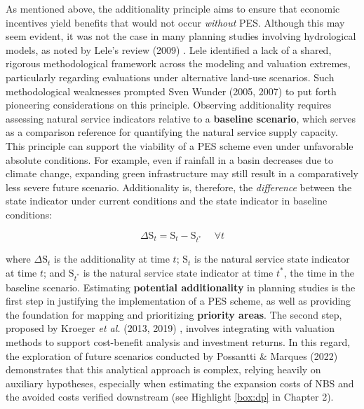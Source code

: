 \documentclass[./main_en.tex]{subfiles}
\begin{document}
As mentioned above, the additionality principle aims to ensure that economic incentives yield benefits that would not occur \textit{without} PES. Although this may seem evident, it was not the case in many planning studies involving hydrological models, as noted by Lele’s review (2009) \cite{Lele2009a}. Lele identified a lack of a shared, rigorous methodological framework across the modeling and valuation extremes, particularly regarding evaluations under alternative land-use scenarios. Such methodological weaknesses prompted Sven Wunder (2005, 2007) \cite{Wunder2005a, Wunder2007a} to put forth pioneering considerations on this principle. Observing additionality requires assessing natural service indicators relative to a \textbf{baseline scenario}, which serves as a comparison reference for quantifying the natural service supply capacity. This principle can support the viability of a PES scheme even under unfavorable absolute conditions. For example, even if rainfall in a basin decreases due to climate change, expanding green infrastructure may still result in a comparatively less severe future scenario. Additionality is, therefore, the \textit{difference} between the state indicator under current conditions and the state indicator in baseline conditions:
\begin{linenomath*}
\begin{equation}
\label{eq:additionality}
\Delta\text{S}_{t} = \text{S}_{t} - \text{S}_{t^*} \quad \; \forall t 
\end{equation}
\end{linenomath*}
\noindent where $\Delta\text{S}_{t}$ is the additionality at time $t$; $\text{S}_{t}$ is the natural service state indicator at time $t$; and $\text{S}_{t^*}$ is the natural service state indicator at time $t^*$, the time in the baseline scenario. Estimating \textbf{potential additionality} in planning studies is the first step in justifying the implementation of a PES scheme, as well as providing the foundation for mapping and prioritizing \textbf{priority areas}. The second step, proposed by Kroeger \textit{et al.} (2013, 2019) \cite{Kroeger2013a, Kroeger2019a}, involves integrating with valuation methods to support cost-benefit analysis and investment returns. In this regard, the exploration of future scenarios conducted by Possantti \& Marques (2022) \cite{Possantti2022a} demonstrates that this analytical approach is complex, relying heavily on auxiliary hypotheses, especially when estimating the expansion costs of NBS and the avoided costs verified downstream (see Highlight \ref{box:dp} in Chapter 2).
\end{document}
